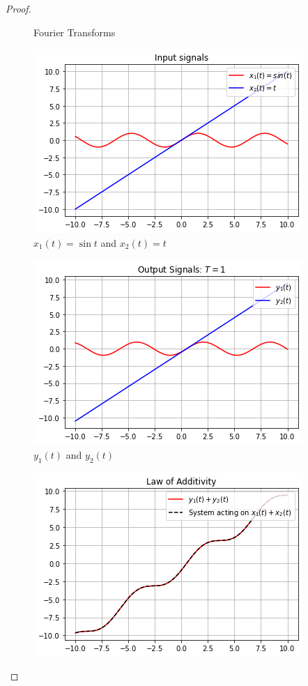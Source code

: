 \documentclass[journal,12pt,twocolumn]{IEEEtran}
\begin{document}
\begin{proof}
\begin{figure}[!ht]
 \caption{Fourier Transforms}
 \end{figure}
\begin{figure}[!ht]
\centering
 \includegraphics[width=\columnwidth]{graphs/input_signals.png}
 \caption{$x_1(t) = \sin{t}$ and $x_2(t) = t$}
 \end{figure}
\begin{figure}[!ht]
\centering
 \includegraphics[width=\columnwidth]{graphs/output_signals.png}
 \caption{$y_1(t)$ and  $y_2(t)$}
 \end{figure}
 \begin{figure}[!ht]
\centering
 \includegraphics[width=\columnwidth]{graphs/law_of_additivity.png}

\end{figure}
\end{proof}
\end{document}
